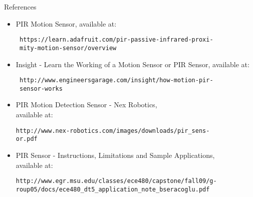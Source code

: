 \documentclass[a4paper,12 pt]{article}
\begin{document}
\newpage
\begin{center}
\huge{References}
\end{center}
\vspace{20mm}
\begin{itemize}
\item PIR Motion Sensor, available at:
\begin{verbatim}
 https://learn.adafruit.com/pir-passive-infrared-proxi-
 mity-motion-sensor/overview
\end{verbatim}
\item Insight - Learn the Working of a Motion Sensor or PIR Sensor, available at:
\begin{verbatim}
 http://www.engineersgarage.com/insight/how-motion-pir-
 sensor-works
\end{verbatim}

\item PIR Motion Detection Sensor - Nex Robotics, \\available at: 
\begin{verbatim}
http://www.nex-robotics.com/images/downloads/pir_sens-
or.pdf
\end{verbatim}

\item PIR  Sensor - Instructions, Limitations and Sample Applications, \\available at: 
\begin{verbatim}
http://www.egr.msu.edu/classes/ece480/capstone/fall09/g-
roup05/docs/ece480_dt5_application_note_bseracoglu.pdf
\end{verbatim}
\end{itemize}
\end{document}
